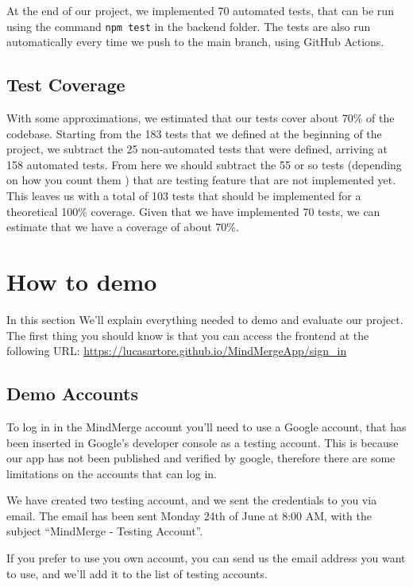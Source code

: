 \documentclass{article}
\begin{document}
At the end of our project, we implemented 70 automated tests, that can be run using the command \texttt{npm test}
in the backend folder.
\newline
The tests are also run automatically every time we push to the main branch, using GitHub Actions.

\subsection{Test Coverage}

With some approximations, we estimated that our tests cover about 70\% of the codebase.
\newline
Starting from the 183 tests that we defined at the beginning of the project, we subtract the 25 non-automated
tests that were defined, arriving at 158 automated tests.
\newline
From here we should subtract the 55 or so tests (depending on how you count them ) that
are testing feature that are not implemented yet. This leaves us with a total of 103 tests that should be implemented 
for a theoretical 100\% coverage.
\newline
Given that we have implemented 70 tests, we can estimate that we have a coverage of about 70\%.

\section{How to demo}
In this section We'll explain everything needed to demo and evaluate our project.
The first thing you should know is that you can access the frontend at the following URL: \url{https://lucasartore.github.io/MindMergeApp/sign_in}
\subsection{Demo Accounts}

To log in in the MindMerge account you'll need to use a Google account, that has been inserted in Google's developer console as a testing account.
This is because our app has not been published and verified by google, therefore there are some limitations on the accounts that can log in.

We have created two testing account, and we sent the credentials to you via email.
The email has been sent Monday 24th of June at 8:00 AM, with the subject ``MindMerge - Testing Account''.

If you prefer to use you own account, you can send us the email address you want to use, and we'll add it to the list of testing accounts.
\end{document}
